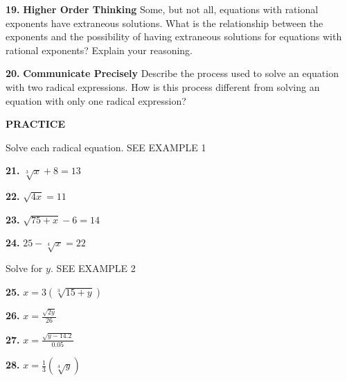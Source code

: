 \documentclass{article}
\newenvironment{practice}[2]{\noindent\textbf{#1.}}{}
\begin{document}
\begin{minipage}[t]{0.45\textwidth}
\begin{practice}{19}{}
\textbf{Higher Order Thinking} Some, but not all, equations with rational exponents have extraneous solutions. What is the relationship between the exponents and the possibility of having extraneous solutions for equations with rational exponents? Explain your reasoning.
\end{practice}

\begin{practice}{20}{}
\textbf{Communicate Precisely} Describe the process used to solve an equation with two radical expressions. How is this process different from solving an equation with only one radical expression?
\end{practice}
\end{minipage}
\hfill
\begin{minipage}[t]{0.5\textwidth}
\textbf{\large PRACTICE}

Solve each radical equation. \textsc{SEE EXAMPLE 1}

\begin{practice}{21}{}
$\sqrt[3]{x} + 8 = 13$
\end{practice}

\begin{practice}{22}{}
$\sqrt{4x} = 11$
\end{practice}

\begin{practice}{23}{}
$\sqrt{75 + x} - 6 = 14$
\end{practice}

\begin{practice}{24}{}
$25 - \sqrt[4]{x} = 22$
\end{practice}

Solve for $y$. \textsc{SEE EXAMPLE 2}

\begin{practice}{25}{}
$x = 3(\sqrt[3]{15 + y})$
\end{practice}

\begin{practice}{26}{}
$x = \frac{\sqrt{2y}}{26}$
\end{practice}

\begin{practice}{27}{}
$x = \frac{\sqrt{y - 14.2}}{0.05}$
\end{practice}

\begin{practice}{28}{}
$x = \frac{1}{3}(\sqrt[4]{y})$
\end{practice}


\end{minipage}
\end{document}
